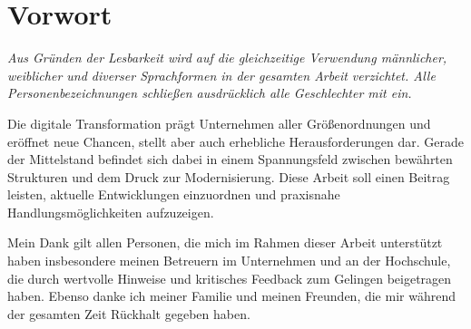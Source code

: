 \newpage
{}
\section*{Vorwort}

\textit{Aus Gründen der Lesbarkeit wird auf die gleichzeitige Verwendung männlicher, 
weiblicher und diverser Sprachformen in der gesamten Arbeit verzichtet. 
Alle Personenbezeichnungen schließen ausdrücklich alle Geschlechter mit ein.}

Die digitale Transformation prägt Unternehmen aller Größenordnungen und eröffnet neue Chancen, stellt aber auch erhebliche Herausforderungen dar. 
Gerade der Mittelstand befindet sich dabei in einem Spannungsfeld zwischen bewährten Strukturen und dem Druck zur Modernisierung. Diese Arbeit soll einen Beitrag leisten, aktuelle Entwicklungen einzuordnen und praxisnahe Handlungsmöglichkeiten aufzuzeigen. 

Mein Dank gilt allen Personen, die mich im Rahmen dieser Arbeit unterstützt haben insbesondere meinen Betreuern im Unternehmen und an der Hochschule, die durch wertvolle Hinweise und kritisches Feedback zum Gelingen beigetragen haben. 
Ebenso danke ich meiner Familie und meinen Freunden, die mir während der gesamten Zeit Rückhalt gegeben haben. 
